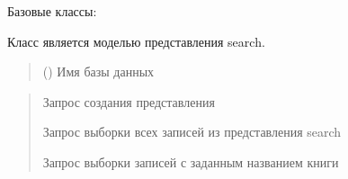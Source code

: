 \documentclass[letterpaper,10pt,russian]{sphinxmanual}
\begin{document}
\begin{fulllineitems}
\label{\detokenize{database.sqlite3_interface.views:database.sqlite3_interface.views.view_search.ViewSearch}}
\pysigstartsignatures
{}
\pysigstopsignatures
\sphinxAtStartPar
Базовые классы: {\hyperref[\detokenize{database.sqlite3_interface.views:database.sqlite3_interface.views.view.View}]{}}

\sphinxAtStartPar
Класс является моделью представления search.
\begin{quote}\begin{description}
\sphinxAtStartPar
{} () \textendash{} Имя базы данных

\end{description}\end{quote}
\begin{description}
\begin{quote}\begin{description}
\sphinxAtStartPar
Запрос создания представления

\sphinxAtStartPar
Запрос выборки всех записей из представления search

\sphinxAtStartPar
Запрос выборки записей с заданным названием книги

\end{description}\end{quote}


\end{description}
\end{fulllineitems}
\end{document}
